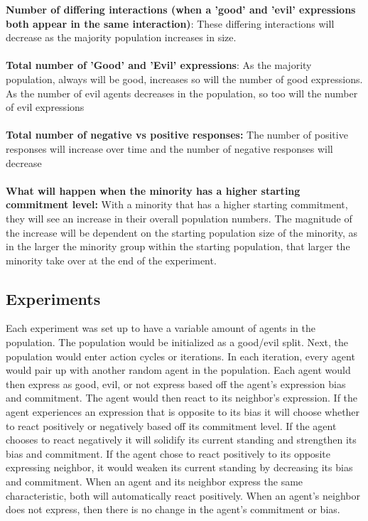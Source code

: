 \documentclass[]{article}
\begin{document}
\textbf{Number of differing interactions (when a 'good' and 'evil' expressions both appear in the same interaction)}: These differing interactions will decrease as the majority population increases in size.
\\
\\
\textbf{Total number of 'Good' and 'Evil' expressions}: As the majority population, always will be good, increases so will the number of good expressions. As the number of evil agents decreases in the population, so too will the number of evil expressions
\\
\\
\textbf{Total number of negative vs positive responses:} The number of positive responses will increase over time and the number of negative responses will decrease
\\
\\
\textbf{What will happen when the minority has a higher starting commitment level:} With a minority that has a higher starting commitment, they will see an increase in their overall population numbers. The magnitude of the increase will be dependent on the starting population size of the minority, as in the larger the minority group within the starting population, that larger the minority take over at the end of the experiment. 



\subsection{Experiments}
Each experiment was set up to have a variable amount of agents in the population. The population would be initialized as a good/evil split. Next, the population would enter action cycles or iterations. In each iteration, every agent would pair up with another random agent in the population. Each agent would then express as good, evil, or not express based off the agent's expression bias and commitment. The agent would then react to its neighbor's expression. If the agent experiences an expression that is opposite to its bias it will choose whether to react positively or negatively based off its commitment level. If the agent chooses to react negatively it will solidify its current standing and strengthen its bias and commitment. If the agent chose to react positively to its opposite expressing neighbor, it would weaken its current standing by decreasing its bias and commitment. When an agent and its neighbor express the same characteristic, both will automatically react positively. When an agent's neighbor does not express, then there is no change in the agent's commitment or bias.
\end{document}
